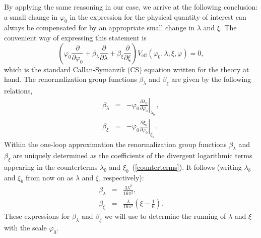 By applying the same reasoning in our case, we arrive at the following
conclusion: a small change in $\varphi_0$ in the expression
for the physical quantity of interest can always be compensated for
by an appropriate small change in $\lambda$ and $\xi$. The
convenient way of expressing this statement is
\begin{equation}
\left(\varphi_0\frac{\partial}{\partial\varphi_0} +
\beta_\lambda\frac{\partial}{\partial\lambda} +
\beta_\xi\frac{\partial}{\partial\xi}\right)V_{\mathrm{eff}}(\varphi_0,
\lambda, \xi, \varphi) = 0, \label{callan-symanzik}
\end{equation}
which is the standard Callan-Symanzik (CS) equation written for the
theory at hand. The renormalization group
functions $\beta_\lambda$ and $\beta_\xi$ are given by the
following relations,
\begin{eqnarray}
\beta_\lambda &=&
-\varphi_0\left.\frac{\partial\lambda_0}{\partial\varphi_0}\right|_{\lambda_b}\,,\nonumber\\
\beta_\xi &=&
-\varphi_0\left.\frac{\partial\xi_0}{\partial\varphi_0}\right|_{\xi_b}\,.
\end{eqnarray}
Within the one-loop approximation the renormalization group
functions $\beta_\lambda$ and $\beta_\xi$ are uniquely determined
as the coefficients of the divergent logarithmic terms appearing in
the counterterms $\lambda_0$ and $\xi_0$~(\ref{counterterms}). It
follows (writing $\lambda_b$ and $\xi_b$ from now on as $\lambda$
and $\xi$, respectively):
\begin{eqnarray}
\beta_\lambda & = & \frac{3\lambda^{2}}{16\pi^2},\nonumber\\
\beta_\xi     & = &
\frac{\lambda}{16\pi^2}\left(\xi-\frac16\right).
\label{betafunctionsfinal}
\end{eqnarray}
These expressions for $\beta_\lambda$ and $\beta_\xi$ we will use
to determine the running of $\lambda$ and $\xi$ with the scale $\varphi_0$.

